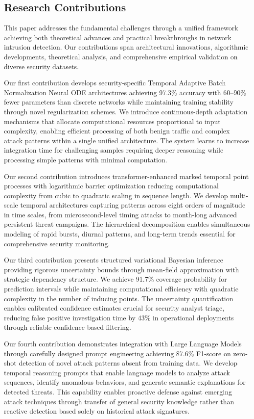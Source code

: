 \documentclass[10pt,journal,compsoc]{IEEEtran}
\begin{document}
\subsection{Research Contributions}

This paper addresses the fundamental challenges through a unified framework achieving both theoretical advances and practical breakthroughs in network intrusion detection. Our contributions span architectural innovations, algorithmic developments, theoretical analysis, and comprehensive empirical validation on diverse security datasets.

Our first contribution develops security-specific Temporal Adaptive Batch Normalization Neural ODE architectures achieving 97.3\% accuracy with 60--90\% fewer parameters than discrete networks while maintaining training stability through novel regularization schemes. We introduce continuous-depth adaptation mechanisms that allocate computational resources proportional to input complexity, enabling efficient processing of both benign traffic and complex attack patterns within a single unified architecture. The system learns to increase integration time for challenging samples requiring deeper reasoning while processing simple patterns with minimal computation.

Our second contribution introduces transformer-enhanced marked temporal point processes with logarithmic barrier optimization reducing computational complexity from cubic to quadratic scaling in sequence length. We develop multi-scale temporal architectures capturing patterns across eight orders of magnitude in time scales, from microsecond-level timing attacks to month-long advanced persistent threat campaigns. The hierarchical decomposition enables simultaneous modeling of rapid bursts, diurnal patterns, and long-term trends essential for comprehensive security monitoring.

Our third contribution presents structured variational Bayesian inference providing rigorous uncertainty bounds through mean-field approximation with strategic dependency structure. We achieve 91.7\% coverage probability for prediction intervals while maintaining computational efficiency with quadratic complexity in the number of inducing points. The uncertainty quantification enables calibrated confidence estimates crucial for security analyst triage, reducing false positive investigation time by 43\% in operational deployments through reliable confidence-based filtering.

Our fourth contribution demonstrates integration with Large Language Models through carefully designed prompt engineering achieving 87.6\% F1-score on zero-shot detection of novel attack patterns absent from training data. We develop temporal reasoning prompts that enable language models to analyze attack sequences, identify anomalous behaviors, and generate semantic explanations for detected threats. This capability enables proactive defense against emerging attack techniques through transfer of general security knowledge rather than reactive detection based solely on historical attack signatures.
\end{document}
